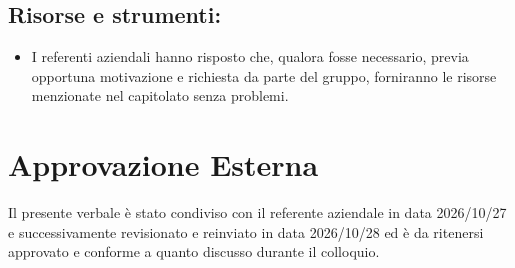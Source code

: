 \documentclass[a4paper, 11pt]{article}
\begin{document}
\subsection{Risorse e strumenti:}
\begin{itemize}
    \item I referenti aziendali hanno risposto che, qualora fosse necessario, previa opportuna motivazione e richiesta da parte del gruppo, forniranno le risorse menzionate nel capitolato senza problemi. \vspace{-0.1cm}
\end{itemize}
\newpage


\section{Approvazione Esterna}

Il presente verbale è stato condiviso con il referente aziendale in data 2026/10/27 e successivamente revisionato e reinviato in data 2026/10/28 ed è da ritenersi approvato e conforme a quanto discusso durante il colloquio. 

\vspace{3cm}
\end{document}
